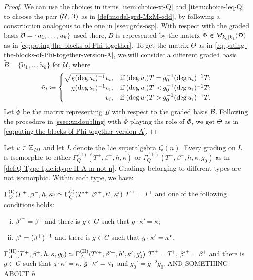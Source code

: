\begin{proof}
    We can use the choices in items \eqref{item:choice-xi-Q} and \eqref{item:choice-leq-Q} to choose the pair $(\mathcal U, B)$ as in \cref{def:model-grd-MxM-odd}, by following a construction analogous to the one in \cref{ssec:grds-osp}. 
    With respect with the graded basis $\mathcal B = \{ u_1, \ldots, u_k \}$ used there, $B$ is represented by the matrix $\Phi \in M_{k_{\bar{0}} | k_{\bar{1}}}(\mathcal{D})$ as in \cref{eq:puting-the-blocks-of-Phi-together}. 
    To get the matrix $\Theta$ as in \cref{eq:puting-the-blocks-of-Phi-together-version-A}, we will consider a different graded basis $\tilde B = \{ \tilde u_1, \ldots, \tilde u_k \}$ for $\mathcal U$, where
    \[
        \tilde u_i \coloneqq 
        \begin{cases}
            \sqrt{\chi(\deg u_i)\inv} u_i, & \text{if }(\deg u_i) T = g_0\inv (\deg u_i)\inv T;\\
            \hfill \chi(\deg u_i)\inv u_i, & \text{if }(\deg u_i) T < g_0\inv (\deg u_i)\inv T;\\
            \hfill u_i, & \text{if }(\deg u_i) T > g_0\inv (\deg u_i)\inv T.
        \end{cases}
    \]
    Let $\tilde \Phi$ be the matrix representing $B$ with respect to the graded basis $\tilde {\mathcal B}$. 
    Following the procedure in \cref{ssec:undoubling} with $\tilde \Phi$ playing the role of $\Phi$, we get  $\Theta$ as in \cref{eq:puting-the-blocks-of-Phi-together-version-A}. 
\end{proof}


\begin{thm}\label{thm:final-Q(n)}
    Let $n \in \mathbb{Z}_{\geq 0}$ and 
    let $L$ denote the Lie superalgebra $Q(n)$. 
    Every grading on $L$ is isomorphic to either $\Gamma_Q^{\mathrm{(I)}}(T^+, \beta^+, h, \kappa)$ or $\Gamma_Q^{\mathrm{(II)}}(T^+, \beta^+, h, \kappa, g_0)$ as in \cref{def:Q-Type-I,defi:type-II-A-m-not-n}. 
    Gradings belonging to different types are not isomorphic. 
    Within each type, we have:
    
    \noindent{}
    
    \noindent $\Gamma_Q^{\mathrm{(I)}}(T^+, \beta^+, h, \kappa) \simeq \Gamma_Q^{\mathrm{(I)}}(T'^+, \beta'^+, h', \kappa')$ \IFF  $T'^+ = T^+$ and one of the following conditions holds:
	\begin{enumerate}[(i)]
	    \item $\beta'^+ = \beta^+$ and there is $g\in G$ such that $g \cdot \kappa'=\kappa$; 
	    \item $\beta'= (\beta^+)^{-1}$ and there is $g\in G$ such that $g \cdot \kappa'= \kappa^\star$.
	\end{enumerate}

    \noindent{}
    
    \noindent $\Gamma_A^{\mathrm{(II)}}(T^+, \beta^+, h, \kappa, g_0) \simeq \Gamma_A^{\mathrm{(II)}}(T'^+, \beta'^+, h', \kappa', g_0')$ \IFF
    $T'^+ =T^+$, $\beta'^+ = \beta^+$ and there is $g \in G$ such that $g\cdot\kappa' = \kappa$, $g\cdot\kappa' = \kappa_{\bar{1}}$ and $g_0' = g^{-2}g_0$. 
    AND SOMETHING ABOUT $h$
\end{thm}


